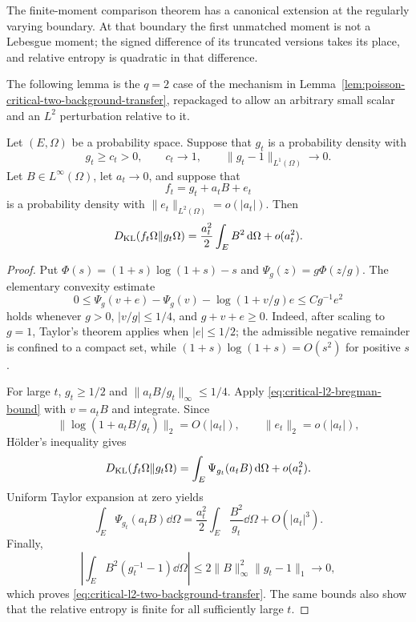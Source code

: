 The finite-moment comparison theorem has a canonical extension at the
regularly varying boundary.  At that boundary the first unmatched moment is
not a Lebesgue moment; the signed difference of its truncated versions takes
its place, and relative entropy is quadratic in that difference.

The following lemma is the \(q=2\) case of the mechanism in
Lemma~\ref{lem:poisson-critical-two-background-transfer}, repackaged to allow
an arbitrary small scalar and an \(L^2\) perturbation relative to it.

\begin{lemma}
\label{lem:critical-l2-two-background-transfer}
Let \((E,\Omega)\) be a probability space.  Suppose that \(g_t\) is a
probability density with
\[
 g_t\ge c_t>0,\qquad c_t\longrightarrow1,
 \qquad \|g_t-1\|_{L^1(\Omega)}\longrightarrow0.
\]
Let \(B\in L^\infty(\Omega)\), let \(a_t\to0\), and suppose that
\[
 f_t=g_t+a_tB+e_t
\]
is a probability density with
\(\|e_t\|_{L^2(\Omega)}=o(|a_t|)\).  Then
\begin{equation}\label{eq:critical-l2-two-background-transfer}
 D_{\rm KL}(f_t\Omega\|g_t\Omega)
 =\frac{a_t^2}{2}\int_E B^2\,\mathrm{d}\Omega+o(a_t^2).
\end{equation}
\end{lemma}

\begin{proof}
Put \(\Phi(s)=(1+s)\log(1+s)-s\) and
\(\Psi_g(z)=g\Phi(z/g)\).  The elementary convexity estimate
\begin{equation}\label{eq:critical-l2-bregman-bound}
 0\le \Psi_g(v+e)-\Psi_g(v)
       -\log(1+v/g)e\le Cg^{-1}e^2
\end{equation}
holds whenever \(g>0\), \(|v/g|\le1/4\), and \(g+v+e\ge0\).
Indeed, after scaling to \(g=1\), Taylor's theorem applies when
\(|e|\le1/2\); the admissible negative remainder is confined to a compact
set, while \((1+s)\log(1+s)=O(s^2)\) for positive \(s\).

For large \(t\), \(g_t\ge1/2\) and
\(\|a_tB/g_t\|_\infty\le1/4\).  Apply
\eqref{eq:critical-l2-bregman-bound} with \(v=a_tB\) and integrate.  Since
\[
 \|\log(1+a_tB/g_t)\|_2=O(|a_t|),
 \qquad \|e_t\|_2=o(|a_t|),
\]
H\"older's inequality gives
\[
 D_{\rm KL}(f_t\Omega\|g_t\Omega)
 =\int_E\Psi_{g_t}(a_tB)\,\mathrm{d}\Omega+o(a_t^2).
\]
Uniform Taylor expansion at zero yields
\[
 \int_E\Psi_{g_t}(a_tB)\dd\Omega
 =\frac{a_t^2}{2}\int_E\frac{B^2}{g_t}\dd\Omega+O(|a_t|^3).
\]
Finally,
\[
 \left|\int_E B^2(g_t^{-1}-1)\dd\Omega\right|
 \le2\|B\|_\infty^2\|g_t-1\|_1\longrightarrow0,
\]
which proves \eqref{eq:critical-l2-two-background-transfer}.  The same
bounds also show that the relative entropy is finite for all sufficiently
large \(t\).
\end{proof}

